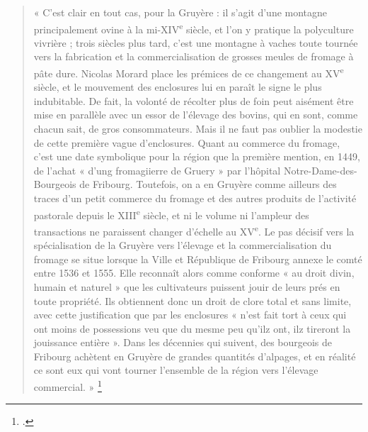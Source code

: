 \documentclass[12pt,a4paper]{report}
\begin{document}
		\begin{quote}
		« C’est clair en tout cas, pour la Gruyère : il s’agit d’une montagne 
		principalement ovine à la mi-XIV\textsuperscript{e} siècle, et l’on y pratique 
		la polyculture vivrière ; trois siècles plus tard, c’est une montagne à vaches 
		toute tournée vers la fabrication et la commercialisation de grosses meules de 
		fromage à pâte dure. Nicolas Morard place les prémices de ce changement au 
		XV\textsuperscript{e} siècle, et le mouvement des enclosures lui en paraît le 
		signe le plus indubitable. De fait, la volonté de récolter plus de foin peut 
		aisément être mise en parallèle avec un essor de l’élevage des bovins, qui en 
		sont, comme chacun sait, de gros consommateurs. Mais il ne faut pas oublier la 
		modestie de cette première vague d’enclosures. Quant au commerce du fromage, 
		c’est une date symbolique pour la région que la première mention, en 1449, de 
		l’achat « d’ung fromagiierre de Gruery » par l’hôpital Notre-Dame-des-Bourgeois 
		de Fribourg. Toutefois, on a en Gruyère comme ailleurs des traces d’un petit 
		commerce du fromage et des autres produits de l’activité pastorale depuis le 
		XIII\textsuperscript{e} siècle, et ni le volume ni l’ampleur des transactions 
		ne paraissent changer d’échelle au XV\textsuperscript{e}. Le pas décisif vers 
		la spécialisation de la Gruyère vers l’élevage et la commercialisation du fromage 
		se situe lorsque la Ville et République de Fribourg annexe le comté entre 1536 
		et 1555. Elle reconnaît alors comme conforme « au droit divin, humain et naturel » 
		que les cultivateurs puissent jouir de leurs prés en toute propriété. Ils 
		obtiennent donc un droit de clore total et sans limite, avec cette justification 
		que par les enclosures « n’est fait tort à ceux qui ont moins de possessions veu 
		que du mesme peu qu’ilz ont, ilz tireront la jouissance entière ». Dans les 
		décennies qui suivent, des bourgeois de Fribourg achètent en Gruyère de grandes 
		quantités d’alpages, et en réalité ce sont eux qui vont tourner l’ensemble de 
		la région vers l’élevage commercial. »
		\footcite[287]{CarrierMouthon2010PaysansAlpes}
	\end{quote}
	
\end{document}
